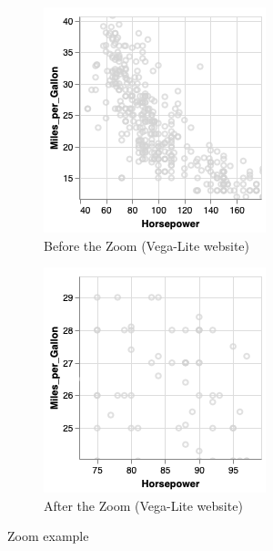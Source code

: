 \begin{figure}[h]
\begin{subfigure}{.5\textwidth}
  \centering
  \captionsetup{justification=centering}
  \includegraphics[width=.8\linewidth]{Report-latex/tex_files/pics/zoom1.png}  
  \caption{Before the Zoom (Vega-Lite website)}
  \label{fig:sub-first}
\end{subfigure}
\begin{subfigure}{.5\textwidth}
  \centering
  \captionsetup{justification=centering}
  \includegraphics[width=.8\linewidth]{Report-latex/tex_files/pics/zoom2.png}  
  \caption{After the Zoom (Vega-Lite website)}
  \label{fig:sub-second}
\end{subfigure}
\captionsetup{justification=centering}
\caption{Zoom example }
\label{fig:fig}
\end{figure}

